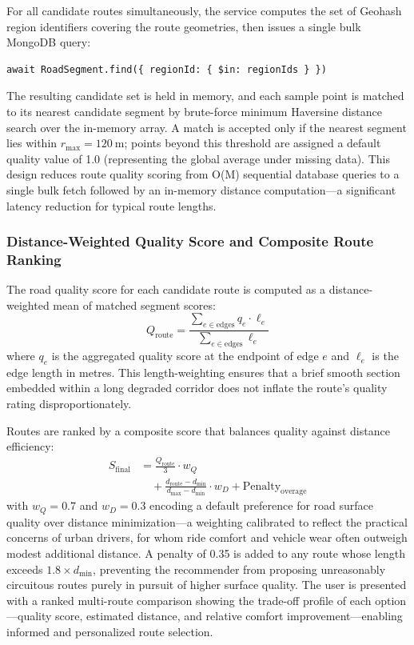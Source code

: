 \documentclass[conference]{IEEEtran}
\begin{document}
For all candidate routes simultaneously, the service computes the set of Geohash region identifiers covering the route geometries, then issues a single bulk MongoDB query:
\begin{verbatim}
await RoadSegment.find({ regionId: { $in: regionIds } })
\end{verbatim}

The resulting candidate set is held in memory, and each sample point is matched to its nearest candidate segment by brute-force minimum Haversine distance search over the in-memory array.
A match is accepted only if the nearest segment lies within $r_{\text{max}} = 120~\text{m}$;
points beyond this threshold are assigned a default quality value of 1.0 (representing the global average under missing data).
This design reduces route quality scoring from O(M) sequential database queries to a single bulk fetch followed by an in-memory distance computation---a significant latency reduction for typical route lengths.

\subsubsection{Distance-Weighted Quality Score and Composite Route Ranking}
The road quality score for each candidate route is computed as a distance-weighted mean of matched segment scores:
\begin{equation}
Q_{\text{route}} = \frac{\sum_{e \in \text{edges}} q_e \cdot \ell_e}{\sum_{e \in \text{edges}} \ell_e}
\end{equation}
where $q_e$ is the aggregated quality score at the endpoint of edge $e$ and $\ell_e$ is the edge length in metres. This length-weighting ensures that a brief smooth section embedded within a long degraded corridor does not inflate the 
route's quality rating disproportionately.

Routes are ranked by a composite score that balances quality against distance efficiency:
\begin{equation}
\begin{split}
S_{\text{final}} &= \frac{Q_{\text{route}}}{3} \cdot w_Q \\
&\quad + \frac{d_{\text{route}} - d_{\min}}{d_{\max} - d_{\min}} \cdot w_D + \text{Penalty}_{\text{overage}}
\end{split}
\end{equation}
with $w_Q = 0.7$ and $w_D = 0.3$ encoding a default preference for road surface quality over distance minimization---a weighting calibrated to reflect the practical concerns of urban drivers, for whom ride comfort and vehicle wear often outweigh modest additional distance.
A penalty of 0.35 is added to any route whose length exceeds $1.8 \times d_{\min}$, preventing the recommender from proposing unreasonably circuitous routes purely in pursuit of higher surface quality.
The user is presented with a ranked multi-route comparison showing the trade-off profile of each option---quality score, estimated distance, and relative comfort improvement---enabling informed and personalized route selection.
\end{document}

